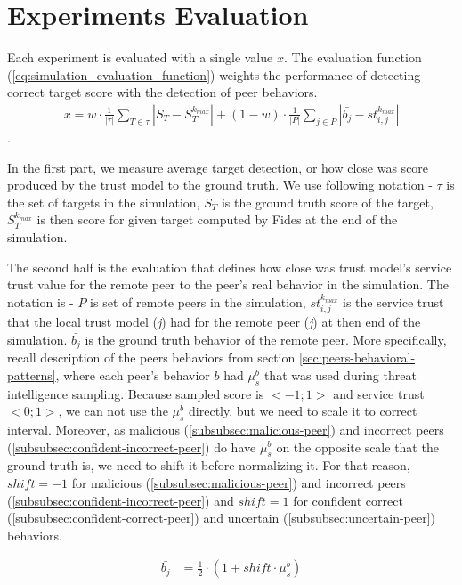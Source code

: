 
\section{Experiments Evaluation}
\label{sec:experiments-evaluation}

Each experiment is evaluated with a single value $x$.
The evaluation function (\ref{eq:simulation_evaluation_function}) weights the performance of detecting correct target score with the detection of peer behaviors.
\begin{equation}
\begin{split}
    x = w \cdot \frac{1}{|\tau|} \sum_{T \in \tau}\left|S_{T} - S^{k_{max}}_{T} \right| + \left(1 - w\right) \cdot \frac{1}{|P|} \sum_{j \in P}\left|\bar{b_{j}} - st^{k_{max}}_{i, j} \right|
\end{split}
\label{eq:simulation_evaluation_function}
\end{equation}.

In the first part, we measure average target detection, or how close was score produced by the trust model to the ground truth.
We use following notation - $\tau$ is the set of targets in the simulation, $S_{T}$ is the ground truth score of the target, $S^{k_{max}}_{T}$ is then score for given target computed by Fides at the end of the simulation.

The second half is the evaluation that defines how close was trust model's service trust value for the remote peer to the peer's real behavior in the simulation.
The notation is - $P$ is set of remote peers in the simulation, $st^{k_{max}}_{i, j}$ is the service trust that the local trust model (\textit{j}) had for the remote peer (\textit{j}) at then end of the simulation.
$\bar{b_{j}}$ is the ground truth behavior of the remote peer. 
More specifically, recall description of the peers behaviors from section \ref{sec:peers-behavioral-patterns}, where each peer's behavior $b$ had $\mu^{b}_{s}$ that was used during threat intelligence sampling.
Because sampled score is $<-1; 1>$ and service trust $<0; 1>$, we can not use the $\mu^{b}_{s}$ directly, but we need to scale it to correct interval.
Moreover, as malicious (\ref{subsubsec:malicious-peer}) and incorrect peers (\ref{subsubsec:confident-incorrect-peer}) do have $\mu^{b}_{s}$ on the opposite scale that the ground truth is, we need to shift it before normalizing it.
For that reason, $shift = -1$ for malicious (\ref{subsubsec:malicious-peer}) and incorrect peers (\ref{subsubsec:confident-incorrect-peer}) and $shift = 1$ for confident correct (\ref{subsubsec:confident-correct-peer}) and uncertain (\ref{subsubsec:uncertain-peer}) behaviors.

\begin{equation}
    \begin{split}
    \bar{b_{j}} &= \frac{1}{2} \cdot \left(1 + shift \cdot \mu^{b}_{s} \right)
    \end{split}
\end{equation}
